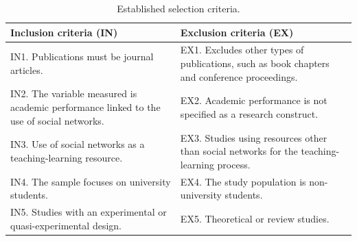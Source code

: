 \documentclass[english]{textolivre}
\begin{document}
\begin{table}[htbp]
\centering
\begin{threeparttable}
\caption{Established selection criteria.}\label{tab-1}
\begin{tabular}{p{} p{}}
\toprule
Inclusion criteria (IN) & Exclusion criteria (EX) \\
\midrule

IN1. Publications must be journal articles. &
EX1. Excludes other types of publications, such as book chapters and conference proceedings. \\

IN2. The variable measured is academic performance linked to the use of social networks. &
EX2. Academic performance is not specified as a research construct. \\

IN3. Use of social networks as a teaching-learning resource. &
EX3. Studies using resources other than social networks for the teaching-learning process. \\

IN4. The sample focuses on university students. &
EX4. The study population is non-university students. \\

IN5. Studies with an experimental or quasi-experimental design. &
EX5. Theoretical or review studies. \\
\bottomrule
\end{tabular}
\end{threeparttable}
\end{table}
\end{document}
